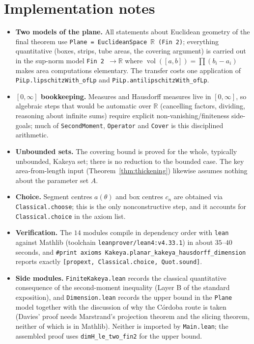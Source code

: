 \documentclass[11pt,a4paper]{article}
\newcommand{\R}{\mathbb{R}}
\newcommand{\ennr}{\ensuremath{[0,\infty]}}          %
\newcommand{\vol}{\operatorname{vol}}                %
\newcommand{\lname}[1]{\texttt{#1}}                  %
\newcommand{\lb}{\_\allowbreak}                      %
\theoremstyle{definition}
\theoremstyle{remark}
\begin{document}
\section{Implementation notes}

\begin{itemize}
\item \textbf{Two models of the plane.}  All statements about Euclidean geometry of the
  final theorem use \lname{Plane = EuclideanSpace}~$\R$~\lname{(Fin 2)}; everything
  quantitative (boxes, strips, tube areas, the covering argument) is carried out in the
  sup-norm model \lname{Fin 2}~$\to\R$ where $\vol([a,b])=\prod(b_i-a_i)$ makes area computations elementary.
  The transfer costs one application of \lname{PiLp.lipschitzWith\_ofLp} and
  \lname{PiLp.antilipschitzWith\_ofLp}.
\item \textbf{$\ennr$ bookkeeping.}  Measures and Hausdorff measures live in $\ennr$, so
  algebraic steps that would be automatic over $\R$ (cancelling factors, dividing,
  reasoning about infinite sums) require explicit non-vanishing/finiteness side-goals;
  much of \lname{SecondMoment}, \lname{Operator} and \lname{Cover} is this disciplined
  arithmetic.
\item \textbf{Unbounded sets.}  The covering bound is proved for the whole, typically
  unbounded, Kakeya set; there is no reduction to the bounded case.  The key
  area-from-length input (Theorem~\ref{thm:thickening}) likewise assumes nothing about the
  parameter set $A$.
\item \textbf{Choice.}  Segment centres $a(\theta)$ and box centres $c_n$ are obtained via
  \lname{Classical.choose}; this is the only nonconstructive step, and it accounts for
  \lname{Classical.choice} in the axiom list.
\item \textbf{Verification.}  The $14$ modules compile in dependency order with
  \lname{lean} against Mathlib (toolchain \lname{leanprover/\allowbreak lean4:v4.33.1})
  in about
  $35$--$40$ seconds, and
  \lname{\#print axioms Kakeya.planar\lb kakeya\lb hausdorff\lb dimension} reports
  exactly \lname{[propext, Classical.choice, Quot.sound]}.
\item \textbf{Side modules.}  \lname{FiniteKakeya.lean} records the classical
  quantitative consequence of the second-moment inequality (Layer B of the standard
  exposition), and \lname{Dimension.lean} records the upper bound in the \lname{Plane}
  model together with the discussion of why the C\'ordoba route is taken (Davies' proof
  needs Marstrand's projection theorem and the slicing theorem, neither of which is in
  Mathlib).  Neither is imported by \lname{Main.lean}; the assembled proof uses
  \lname{dimH\_le\_two\_fin2} for the upper bound.
\end{itemize}
\end{document}
